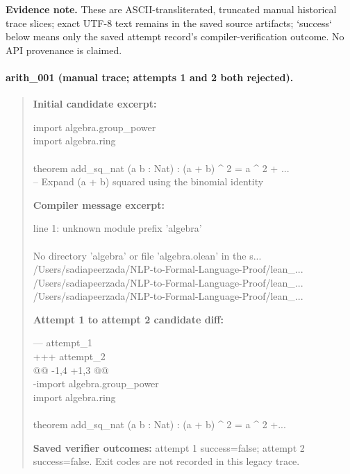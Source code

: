 \noindent\textbf{Evidence note.} These are ASCII-transliterated, truncated manual historical trace slices; exact UTF-8 text remains in the saved source artifacts; `success` below means only the saved attempt record's compiler-verification outcome. No API provenance is claimed.
\paragraph{arith\_001 (manual trace; attempts 1 and 2 both rejected).}
\begin{quote}\small
\textbf{Initial candidate excerpt:}\par\ttfamily
import algebra.group\_power\\
import algebra.ring\\
\\
theorem add\_sq\_nat (a b : Nat) : (a + b) \textasciicircum{} 2 = a \textasciicircum{} 2 + ...\\
  -- Expand (a + b) squared using the binomial identity\\
\par\textbf{Compiler message excerpt:}\par\ttfamily
line 1: unknown module prefix 'algebra'\\
\\
No directory 'algebra' or file 'algebra.olean' in the s...\\
/Users/sadiapeerzada/NLP-to-Formal-Language-Proof/lean\_...\\
/Users/sadiapeerzada/NLP-to-Formal-Language-Proof/lean\_...\\
/Users/sadiapeerzada/NLP-to-Formal-Language-Proof/lean\_...\\
\par\textbf{Attempt 1 to attempt 2 candidate diff:}\par\ttfamily
--- attempt\_1\\
+++ attempt\_2\\
@@ -1,4 +1,3 @@\\
-import algebra.group\_power\\
 import algebra.ring\\
 \\
 theorem add\_sq\_nat (a b : Nat) : (a + b) \textasciicircum{} 2 = a \textasciicircum{} 2 +...\\
\par\textbf{Saved verifier outcomes:} attempt 1 success=false; attempt 2 success=false. Exit codes are not recorded in this legacy trace.
\end{quote}
